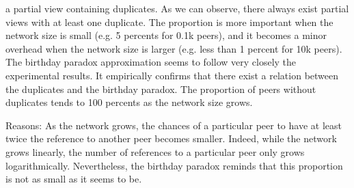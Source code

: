 \begin{asparadesc}
  a partial view containing duplicates. As we can observe, there always exist
  partial views with at least one duplicate. The proportion is more important
  when the network size is small (e.g. 5 percents for 0.1k peers), and it
  becomes a minor overhead when the network size is larger (e.g. less than 1
  percent for 10k peers). The birthday paradox approximation seems to follow
  very closely the experimental results. It empirically confirms that there
  exist a relation between the duplicates and the birthday paradox. The
  proportion of peers without duplicates tends to 100 percents as the network
  size grows.
\item[Reasons:] As the network grows, the chances of a particular peer to have
  at least twice the reference to another peer becomes smaller. Indeed, while
  the network grows linearly, the number of references to a particular peer
  only grows logarithmically. Nevertheless, the birthday paradox reminds that
  this proportion is not as small as it seems to be.
\end{asparadesc}


